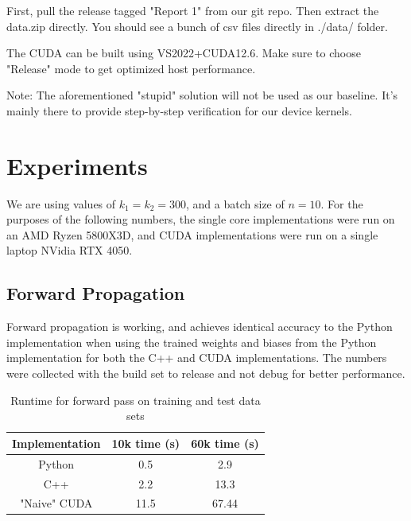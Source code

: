 \documentclass[sigconf,authorversion,nonacm]{acmart}
\begin{document}
First, pull the release tagged "Report 1" from our git repo\cite{CSC586C_Project}. Then extract the data.zip directly. You should see a bunch of csv files directly in ./data/ folder.

The CUDA can be built using VS2022+CUDA12.6. Make sure to choose "Release" mode to get optimized host performance.

Note: The aforementioned "stupid" solution will not be used as our baseline. It's mainly there to provide step-by-step verification for our device kernels.

\section{Experiments}
We are using values of $k_1=k_2=300$, and a batch size of $n=10$. For the purposes of the following numbers, the single core implementations were run on an AMD Ryzen 5800X3D, and CUDA implementations were run on a single laptop NVidia RTX 4050.

\subsection{Forward Propagation}
Forward propagation is working, and achieves identical accuracy to the Python implementation when using the trained weights and biases from the Python implementation for both the C++ and CUDA implementations. The numbers were collected with the build set to release and not debug for better performance.

\begin{table}[H]
    \centering
    \begin{tabular}{ccc}
        Implementation & 10k time (s) & 60k time (s) \\ \hline
        Python & 0.5 & 2.9 \\
        C++ & 2.2 & 13.3 \\
        "Naive" CUDA & 11.5 & 67.44 \\
    \end{tabular}
    \caption{Runtime for forward pass on training and test data sets}
    \label{tab:my_label}
\end{table}
\end{document}
